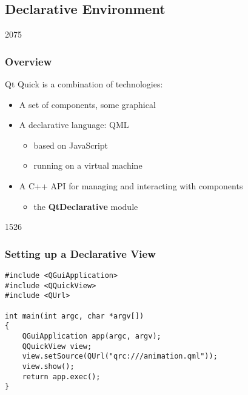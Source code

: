 %
%
%
%

\subsection{Declarative Environment}

\begin{slide}{2075}\frametitle{Overview}

Qt Quick is a combination of technologies:

\begin{itemize}
\item A set of components, some graphical
\item A declarative language: QML
  \begin{itemize}
  \item based on JavaScript
  \item running on a virtual machine
  \end{itemize}
\item A C++ API for managing and interacting with components
  \begin{itemize}
  \item the \textbf{QtDeclarative} module
  \end{itemize}
\end{itemize}

\end{slide}

\begin{slide}[fragile]{1526}\frametitle{Setting up a Declarative View}

\begin{lstlisting}
#include <QGuiApplication>
#include <QQuickView>
#include <QUrl>

int main(int argc, char *argv[])
{
    QGuiApplication app(argc, argv);
    QQuickView view;
    view.setSource(QUrl("qrc:///animation.qml"));
    view.show();
    return app.exec();
}
\end{lstlisting}

\end{slide}

